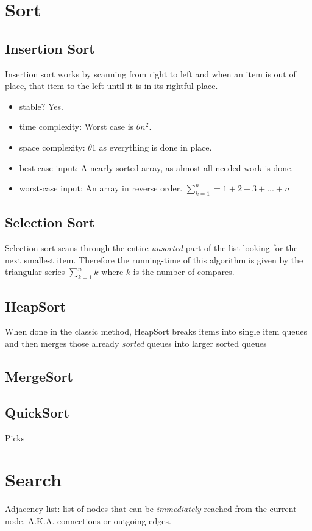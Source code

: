 \documentclass[12pt, letterpaper]{article}
\begin{document}
\section{Sort}
\subsection{Insertion Sort}
Insertion sort works by scanning from right to left and when an item is out of place,  that item to the left until it is in its rightful place.
\begin{itemize}
\item stable? Yes.
\item time complexity:
Worst case is $\theta n^2$.
\item space complexity: 
$\theta 1$ as everything is done in place.
\item best-case input:
A nearly-sorted array, as almost all needed work is done. 
\item worst-case input: An array in reverse order. $\sum_{k=1}^{n} = 1 + 2 + 3 + ... + n$
\end{itemize}
\subsection{Selection Sort}
Selection sort scans through the entire \emph{unsorted} part of the list looking for the next smallest item. Therefore the running-time of this algorithm is given by the triangular series $\sum_{k=1}^n k$ where $k$ is the number of compares.

\subsection{HeapSort}
When done in the classic  method, HeapSort breaks items into single item queues and then merges those already \textit{sorted} queues into larger sorted queues
\subsection{MergeSort}
\subsection{QuickSort}
Picks 
\section{Search}
Adjacency list: list of nodes that can be \emph{immediately} reached from the current node. A.K.A. connections or outgoing edges.
\end{document}

